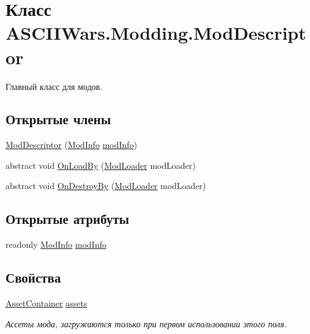 \hypertarget{class_a_s_c_i_i_wars_1_1_modding_1_1_mod_descriptor}{}\section{Класс A\+S\+C\+I\+I\+Wars.\+Modding.\+Mod\+Descriptor}
\label{class_a_s_c_i_i_wars_1_1_modding_1_1_mod_descriptor}


Главный класс для модов.  


\subsection*{Открытые члены}
\begin{DoxyCompactItemize}
\item 
\hyperlink{class_a_s_c_i_i_wars_1_1_modding_1_1_mod_descriptor_a7a7b93295cc97ebd7fbcdf74763794d7}{Mod\+Descriptor} (\hyperlink{class_a_s_c_i_i_wars_1_1_modding_1_1_mod_info}{Mod\+Info} \hyperlink{class_a_s_c_i_i_wars_1_1_modding_1_1_mod_descriptor_a89890adfa5b31278c157f91fc50a1fcc}{mod\+Info})
\item 
abstract void \hyperlink{class_a_s_c_i_i_wars_1_1_modding_1_1_mod_descriptor_a087f1c678b77fd17441f1cfe32d43878}{On\+Load\+By} (\hyperlink{class_a_s_c_i_i_wars_1_1_modding_1_1_mod_loader}{Mod\+Loader} mod\+Loader)
\item 
abstract void \hyperlink{class_a_s_c_i_i_wars_1_1_modding_1_1_mod_descriptor_ab46b22497373a1bc6aab9e24f890088f}{On\+Destroy\+By} (\hyperlink{class_a_s_c_i_i_wars_1_1_modding_1_1_mod_loader}{Mod\+Loader} mod\+Loader)
\end{DoxyCompactItemize}
\subsection*{Открытые атрибуты}
\begin{DoxyCompactItemize}
\item 
readonly \hyperlink{class_a_s_c_i_i_wars_1_1_modding_1_1_mod_info}{Mod\+Info} \hyperlink{class_a_s_c_i_i_wars_1_1_modding_1_1_mod_descriptor_a89890adfa5b31278c157f91fc50a1fcc}{mod\+Info}
\end{DoxyCompactItemize}
\subsection*{Свойства}
\begin{DoxyCompactItemize}
\item 
\hyperlink{class_a_s_c_i_i_wars_1_1_game_1_1_asset_container}{Asset\+Container} \hyperlink{class_a_s_c_i_i_wars_1_1_modding_1_1_mod_descriptor_a82a17c3c62a3ad79059ad1c6124e5a1e}{assets}
\begin{DoxyCompactList}\small\item\em Ассеты мода, загружаются только при первом использовании этого поля. \end{DoxyCompactList}\end{DoxyCompactItemize}
